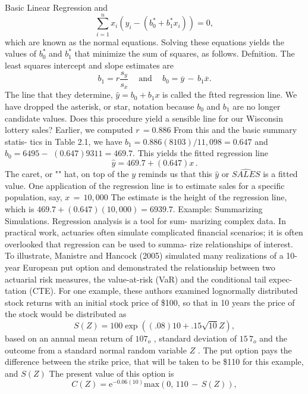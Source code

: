 \documentclass[11pt]{article}
\begin{document}
 Basic Linear Regression
and
\[
\sum_{i=1}^{n} x_{i} \left( y_{i}-\left( b_{0}^{*}+b_{1}^{*} x_{i} \right) \right)=0 ,
\]
which are known as the normal equations. Solving these equations yields the
 values of \(b_{0}^{*}\) and \(b_{1}^{*}\) that minimize the sum of squares, as follows.
Defnition. The least squares intercept and slope estimates are
\[
b_{1}=r \frac{s_{y}} {s_{x}} \quad\mathrm{~ a n d ~} \quad b_{0}=\overline{{y}} \,-\, b_{1} \overline{{x}} .
\]
The line that they determine, \(\widehat{y}=b_{0}+b_{1} x\) is called the ftted regression line.
We have dropped the asterisk, or star, notation because \(b_{0}\) and \(b_{1}\) are no longer
 candidate values.
Does this procedure yield a sensible line for our Wisconsin lottery sales?
Earlier, we computed \(r \,=0 . 8 8 6\) From this and the basic summary statis-
tics in Table 2.1, we have \(b_{1}=0 . 8 8 6 ( 8 1 0 3 ) / 1 1 \! {,} 0 9 8=0 . 6 4 7\) and \(b_{0}=6 4 9 5-\)
\(( 0 . 6 4 7 ) 9 3 1 1=4 6 9 . 7 .\) This yields the fitted regression line
\[
\widehat{y}=4 6 9 . 7+( 0 . 6 4 7 ) x \, .
\]
The caret, or "" hat, on top of the \(y\) reminds us that this \(\widehat{y}\) or \(\widehat{S A L E S}\) is a fitted
value. One application of the regression line is to estimate sales for a specific
population, say, \(x \,=\, 1 0 \mathrm{,} 0 0 0\) The estimate is the height of the regression line,
which is \(4 6 9 . 7+( 0 . 6 4 7 ) ( 1 0 , 0 0 0 )=6 9 3 9 . 7 .\)
Example: Summarizing Simulations. Regression analysis is a tool for sum-
marizing complex data. In practical work, actuaries often simulate complicated
financial scenarios; it is often overlooked that regression can be used to summa-
rize relationships of interest.
 To illustrate, Manistre and Hancock (2005) simulated many realizations of
a 10-year European put option and demonstrated the relationship between two
actuarial risk measures, the value-at-risk (VaR) and the conditional tail expec-
 tation (CTE). For one example, these authors examined lognormally distributed
stock returns with an initial stock price of \$100, so that in 10 years the price of
the stock would be distributed as
\[
S ( Z )=1 0 0 \operatorname{e x p} \left( ( . 0 8 ) 1 0+. 1 5 \sqrt{1 0} Z \right) ,
\]
 based on an annual mean return of \(1 0 7_{o}\) , standard deviation of \(1 5 \, \mathcal{7}_{o}\) and the
 outcome from a standard normal random variable \(Z\) . The put option pays the
 difference between the strike price, that will be taken to be \$110 for this example,
and \(S ( Z )\) The present value of this option is
\[
C ( Z )=\mathrm{e}^{-0 . 0 6 ( 1 0 )} \mathrm{m a x} \left( 0 , \, 1 1 0 \,-\, S ( Z ) \right) ,
\]
\end{document}
